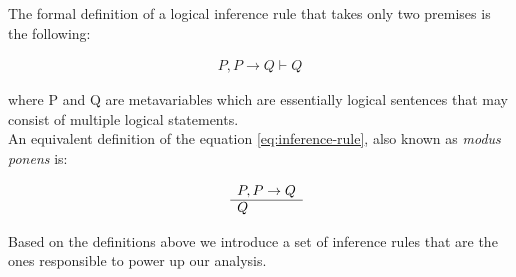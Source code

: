The formal definition of a logical inference rule that takes only two premises is the following:

\begin{equation}
  \label{eq:inference-rule}
  \begin{aligned}
    P, P \rightarrow Q \vdash Q
  \end{aligned}
\end{equation}

where P and Q are metavariables which are essentially logical sentences that may consist
of multiple logical statements.\\

An equivalent definition of the equation \ref{eq:inference-rule}, also known as
\emph{modus ponens} is:

\begin{equation}
  \label{eq:modus-ponens}
  \begin{aligned}
  \begin{array}{rl}
    & P,  P \to Q \\
    \cline{2-2}
    & Q
  \end{array}
  \end{aligned}
\end{equation}

Based on the definitions above we introduce a set of inference rules that are the ones
responsible to power up our analysis.

